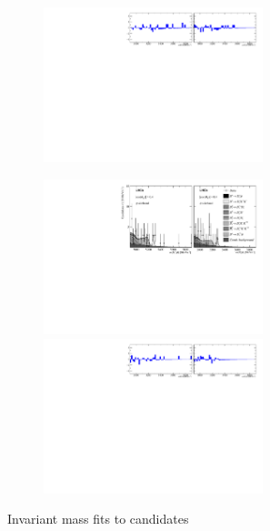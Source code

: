 \begin{figure}[!h]
\begin{subfigure}[t]{1.0\textwidth}
        \includegraphics[width=0.7\textwidth]{figs/Appendix_FitCategories/residuals_DsPhi_Ds2PiPiPi_both_summed_splitHel_splitKKPi_s21_s21r1_s24_s26.pdf}
    \end{subfigure}
    \begin{subfigure}[t]{1.0\textwidth}
        \centering
        \includegraphics[width=0.7\textwidth]{figs/Appendix_FitCategories/canvas_DsPhiSide_Ds2PiPiPi_both_summed_splitHel_splitKKPi_s21_s21r1_s24_s26.pdf}\\
        \includegraphics[width=0.7\textwidth]{figs/Appendix_FitCategories/residuals_DsPhiSide_Ds2PiPiPi_both_summed_splitHel_splitKKPi_s21_s21r1_s24_s26.pdf}
    \end{subfigure}
    \caption{Invariant mass fits to \decay{\Bp}{\Dsp\phiz} candidates}
\end{figure}

